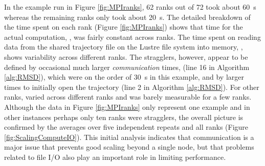 In the example run in Figure \ref{fig:MPIranks}, 62 ranks out of 72 took about 60~s whereas the remaining ranks only took about 20~s. 
The detailed breakdown of the time spent on each rank (Figure \ref{fig:MPIranks}) shows that time
for the actual computation, \tcomp, was fairly constant across ranks. 
The time spent on reading data from the shared trajectory file on the Lustre file system into memory, \tIO, shows variability across different ranks. 
The stragglers, however, appear to be defined by occasional much larger \emph{communication} times, \tcomm (line 16 in Algorithm \ref{alg:RMSD}), which were on the order of 30~s in this example, and by larger times to initially open the trajectory (line 2 in Algorithm \ref{alg:RMSD}).
For other ranks, \tcomm varied across different ranks and was barely measurable for a few ranks.
Although the data in Figure \ref{fig:MPIranks} only represent one example and in other instances perhaps only ten ranks were stragglers, the overall picture is confirmed by the averages over five independent repeats and all ranks (Figure \ref{fig:ScalingComputeIO}).
This initial analysis indicates that communication is a major issue that prevents good scaling beyond a single node, but that problems related to file I/O also play an important role in limiting performance.



